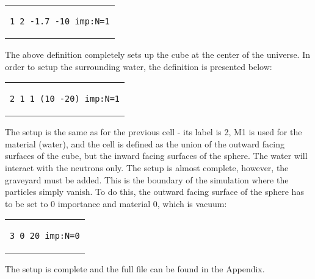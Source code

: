 \begin{center}
\begin{tabular}{c}
\begin{lstlisting}
1 2 -1.7 -10 imp:N=1
\end{lstlisting}
\end{tabular}
\end{center}
The above definition completely sets up the cube at the center of the universe. In order to setup the surrounding water, the definition is presented below:
\begin{center}
\begin{tabular}{c}
\begin{lstlisting}
2 1 1 (10 -20) imp:N=1
\end{lstlisting}
\end{tabular}
\end{center}
The setup is the same as for the previous cell - its label is 2, M1 is used for the material (water), and the cell is defined as the union of the outward facing surfaces of the cube, but the inward facing surfaces of the sphere. The water will interact with the neutrons only. The setup is almost complete, however, the graveyard must be added. This is the boundary of the simulation where the particles simply vanish. To do this, the outward facing surface of the sphere has to be set to 0 importance and material 0, which is vacuum:
\begin{center}
\begin{tabular}{c}
\begin{lstlisting}
3 0 20 imp:N=0
\end{lstlisting}
\end{tabular}
\end{center}
The setup is complete and the full file can be found in the Appendix.
\label{sec:simulations}
